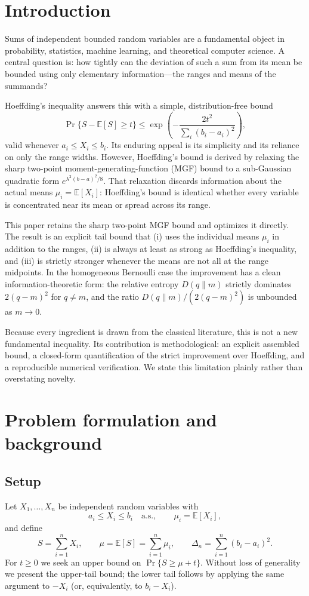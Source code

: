 \documentclass[11pt]{article}
\begin{document}
\section{Introduction}
Sums of independent bounded random variables are a fundamental object in probability, statistics, machine learning, and theoretical computer science. A central question is: how tightly can the deviation of such a sum from its mean be bounded using only elementary information---the ranges and means of the summands?

Hoeffding's inequality \cite{Hoeffding1963} answers this with a simple, distribution-free bound
\[
\Pr\{S-\mathbb{E}[S]\ge t\}\le \exp\!\left(-\frac{2t^2}{\sum_i(b_i-a_i)^2}\right),
\]
valid whenever $a_i\le X_i\le b_i$. Its enduring appeal is its simplicity and its reliance on only the range widths. However, Hoeffding's bound is derived by relaxing the sharp two-point moment-generating-function (MGF) bound to a sub-Gaussian quadratic form $e^{\lambda^2(b-a)^2/8}$. That relaxation discards information about the actual means $\mu_i=\mathbb{E}[X_i]$: Hoeffding's bound is identical whether every variable is concentrated near its mean or spread across its range.

This paper retains the sharp two-point MGF bound and optimizes it directly. The result is an explicit tail bound that (i) uses the individual means $\mu_i$ in addition to the ranges, (ii) is always at least as strong as Hoeffding's inequality, and (iii) is strictly stronger whenever the means are not all at the range midpoints. In the homogeneous Bernoulli case the improvement has a clean information-theoretic form: the relative entropy $D(q\|m)$ strictly dominates $2(q-m)^2$ for $q\neq m$, and the ratio $D(q\|m)/(2(q-m)^2)$ is unbounded as $m\to0$.

Because every ingredient is drawn from the classical literature, this is not a new fundamental inequality. Its contribution is methodological: an explicit assembled bound, a closed-form quantification of the strict improvement over Hoeffding, and a reproducible numerical verification. We state this limitation plainly rather than overstating novelty.

\section{Problem formulation and background}

\subsection{Setup}
Let $X_1,\dots,X_n$ be independent random variables with
\[
a_i \le X_i \le b_i \quad\text{a.s.},\qquad \mu_i=\mathbb{E}[X_i],
\]
and define
\[
S=\sum_{i=1}^n X_i,\qquad \mu=\mathbb{E}[S]=\sum_{i=1}^n\mu_i,\qquad \Delta_n=\sum_{i=1}^n(b_i-a_i)^2.
\]
For $t\ge0$ we seek an upper bound on $\Pr\{S\ge \mu+t\}$. Without loss of generality we present the upper-tail bound; the lower tail follows by applying the same argument to $-X_i$ (or, equivalently, to $b_i-X_i$).
\end{document}
